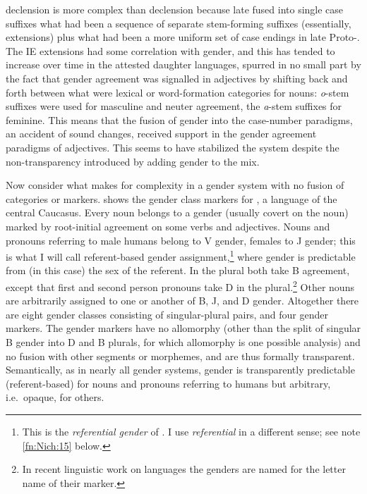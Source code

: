 \documentclass[output=collectionpaper]{langsci/langscibook}
\begin{document}
 declension is more complex than  declension because late  fused into single case suffixes what had been a sequence of separate stem-forming suffixes (essentially, extensions) plus what had been a more uniform set of case endings in late Proto-. The IE extensions had some correlation with gender, and this has tended to increase over time in the attested daughter languages, spurred in no small part by the fact that gender agreement was signalled in adjectives by shifting back and forth between what were lexical or word-formation categories for nouns: \textit{o}-stem suffixes were used for masculine and neuter agreement, the \textit{a}-stem suffixes for feminine. This means that the fusion of gender into the case-number paradigms, an accident of  sound changes, received support in the gender agreement paradigms of adjectives. This seems to have stabilized the system despite the non-transparency introduced by adding gender to the mix.

Now consider what makes for complexity in a gender system with no fusion of categories or markers.  shows the gender class markers for , a  language of the central Caucasus. Every noun belongs to a gender (usually covert on the noun) marked by root-initial agreement on some verbs and adjectives. Nouns and pronouns referring to male humans belong to V gender, females to J gender; this is what I will call referent-based gender assignment,\footnote{%
This is the \textit{referential gender} of \citet{Dahl2000a}.  I use \textit{referential} in a different sense; see note \ref{fn:Nich:15} below.
} %
where gender is predictable from (in this case) the sex of the referent.  In the plural both take B agreement, except that first and second person pronouns take D in the plural.\footnote{%
In recent linguistic work on  languages the genders are named for the letter name of their marker.
} %
Other nouns are arbitrarily assigned to one or another of B, J, and D gender. Altogether there are eight gender classes consisting of singular-plural pairs, and four gender markers. The gender markers have no allomorphy (other than the split of singular B gender into D and B plurals, for which allomorphy is one possible analysis) and no fusion with other segments or morphemes, and are thus formally transparent. Semantically, as in nearly all gender systems, gender is transparently predictable (referent-based) for nouns and pronouns referring to humans but arbitrary, i.e.\ opaque, for others.
\end{document}
